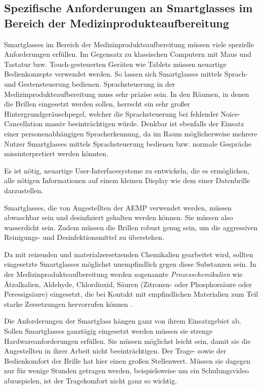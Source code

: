 \subsection{Spezifische Anforderungen an Smartglasses im Bereich der Medizinprodukteaufbereitung}
\label{sec:Spezifische_Anforderungen_an_Smartglasses}
Smartglasses im Bereich der Medizinprodukteaufbereitung müssen viele spezielle Anforderungen erfüllen. Im Gegensatz zu klassischen Computern mit Maus und Tastatur bzw. Touch-gesteuerten Geräten wie Tablets müssen neuartige Bedienkonzepte verwendet werden. So lassen sich Smartglasses mittels Sprach- und Gestensteuerung bedienen.
Sprachsteuerung in der Medizinprodukteaufbereitung muss sehr präzise sein. In den Räumen, in denen die Brillen eingesetzt werden sollen, herrscht ein sehr großer Hintergrundgeräuschpegel, welcher die Sprachsteuerung bei fehlender Noice-Cancellation massiv beeinträchtigen würde. Denkbar ist ebenfalls der Einsatz einer personenabhängigen Spracherkennung, da im Raum möglicherweise mehrere Nutzer Smartglasses mittels Sprachsteuerung bedienen bzw. normale Gespräche missinterpretiert werden könnten. 

Es ist nötig, neuartige User-Interfacesysteme zu entwickeln, die es ermöglichen, alle nötigen Informationen auf einem kleinen Display wie dem einer Datenbrille darzustellen. 

Smartglasses, die von Angestellten der AEMP verwendet werden, müssen abwaschbar sein und desinfiziert gehalten werden können. Sie müssen also wasserdicht sein. Zudem müssen die Brillen robust genug sein, um die aggressiven Reinigungs- und Desinfektionsmittel zu überstehen.

Da mit reizenden und materialzersetzenden Chemikalien gearbeitet wird, sollten eingesetzte Smartglasses möglichst unempfindlich gegen diese Substanzen sein. In der Medizinprodukteaufbereitung werden sogenannte \emph{Prozesschemikalien} wie Ätzalkalien, Aldehyde, Chlordioxid, Säuren (Zitronen- oder Phosphorsäure oder Peressigsäure) eingesetzt, die bei Kontakt mit empfindlichen Materialien zum Teil starke Zersetzungen hervorrufen können \cite{AKI-ArbeitskreisInstrumenten-Aufbereitung2012}.

Die Anforderungen der Smartglass hängen ganz von ihrem Einsatzgebiet ab. Sollen Smartglasses ganztägig eingesetzt werden müssen sie strenge Hardwareanforderungen erfüllen. Sie müssen möglichst leicht sein, damit sie die Angestellten in ihrer Arbeit nicht beeinträchtigen. Der Trage- sowie der Bedienkomfort der Brille hat hier einen großen Stellenwert. Müssen sie dagegen nur für wenige Stunden getragen werden, beispielsweise um ein Schulungsvideo abzuspielen, ist der Tragekomfort nicht ganz so wichtig.

